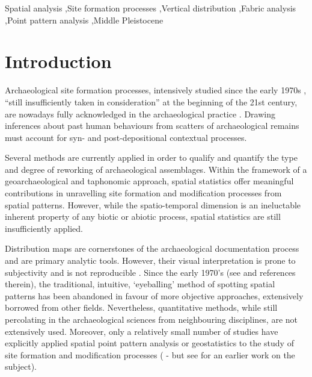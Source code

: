 \documentclass[preprint,authoryear,times]{elsarticle} %
\begin{document}
\begin{frontmatter}
  \begin{keyword}
    Spatial analysis \sep Site formation processes \sep Vertical distribution \sep Fabric analysis \sep Point pattern analysis \sep Middle Pleistocene
  \end{keyword}
  
\end{frontmatter}

\linenumbers

\section{Introduction}

Archaeological site formation processes, intensively studied since the early 1970s \citep[][among others]{Isaac1967,Schiffer1972,Schiffer1983,Schiffer1987,Shackley1978,Wood1978,Binford1981,Schick1984,Schick1986,Schick1987,Petraglia1987,Petraglia1994}, ``still insufficiently taken in consideration'' \citep[][p.379]{Texier2000} at the beginning of the 21st century, are nowadays fully acknowledged in the archaeological practice \citep[][among others]{Villa2004,Bailey2007,Brantingham2007,Malinsky-Buller2011,Vaquero2012,Bargallo2016}. Drawing inferences about past human behaviours from scatters of archaeological remains must account for syn- and post-depositional contextual processes.

Several methods are currently applied in order to qualify and quantify the type and degree of reworking of archaeological assemblages. Within the framework of a geoarchaeological and taphonomic approach, spatial statistics offer meaningful contributions in unravelling site formation and modification processes from spatial patterns. However, while the spatio-temporal dimension is an ineluctable inherent property of any biotic or abiotic process, spatial statistics are still insufficiently applied.

Distribution maps are cornerstones of the archaeological documentation process and are primary analytic tools. However, their visual interpretation is prone to subjectivity and is not reproducible \citep{Bevan2013a}. Since the early 1970's (see \cite{Hodder1976,Orton1982} and references therein), the traditional, intuitive, `eyeballing' method of spotting spatial patterns has been abandoned in favour of more objective approaches, extensively borrowed from other fields. Nevertheless, quantitative methods, while still percolating in the archaeological sciences from neighbouring disciplines, are not extensively used. Moreover, only a relatively small number of studies have explicitly applied spatial point pattern analysis or geostatistics to the study of site formation and modification processes (\cite{Lenoble2008,Dominguez-Rodrigo2014b,Dominguez-Rodrigo2014c,Dominguez-Rodrigo2017,Carrer2015,Giusti2016,Organista2017} - but see \cite{Hivernel1984} for an earlier work on the subject).
\end{document}

